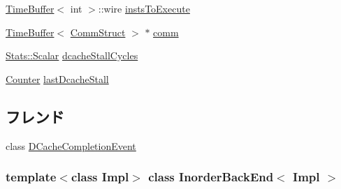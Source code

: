 \begin{DoxyCompactItemize}
\item 
\hyperlink{classTimeBuffer}{TimeBuffer}$<$ int $>$::wire \hyperlink{classInorderBackEnd_aea4c234514337a9dd2233b49732f6638}{instsToExecute}
\item 
\hyperlink{classTimeBuffer}{TimeBuffer}$<$ \hyperlink{classInorderBackEnd_a82fb3c7183ba777a05c510ab2fbcfb82}{CommStruct} $>$ $\ast$ \hyperlink{classInorderBackEnd_a282f2307a986f183b83e887756561687}{comm}
\item 
\hyperlink{classStats_1_1Scalar}{Stats::Scalar} \hyperlink{classInorderBackEnd_a06d11574ef2a7c403c51d626e834d91e}{dcacheStallCycles}
\item 
\hyperlink{base_2types_8hh_ae1475755791765b8e6f6a8bb091e273e}{Counter} \hyperlink{classInorderBackEnd_a8b4696062ef09ab956804a7a99491853}{lastDcacheStall}
\end{DoxyCompactItemize}
\subsection*{フレンド}
\begin{DoxyCompactItemize}
\item 
class \hyperlink{classInorderBackEnd_a27227be5511e316f17702a3a99fb0b98}{DCacheCompletionEvent}
\end{DoxyCompactItemize}
\subsubsection*{template$<$class Impl$>$ class InorderBackEnd$<$ Impl $>$}



